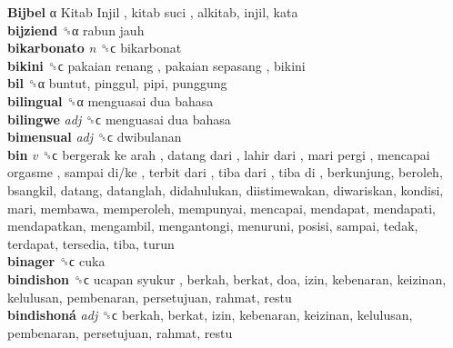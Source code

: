 \textbf{Bijbel} α   Kitab Injil ,  kitab suci , alkitab, injil, kata  \\
\textbf{bijziend} ␝α   rabun jauh   \\
\textbf{bikarbonato} \emph{n}  ␝ϲ  bikarbonat  \\
\textbf{bikini} ␝ϲ   pakaian renang ,  pakaian sepasang , bikini  \\
\textbf{bil} ␝α  buntut, pinggul, pipi, punggung  \\
\textbf{bilingual} ␝α   menguasai dua bahasa   \\
\textbf{bilingwe} \emph{adj}  ␝ϲ   menguasai dua bahasa   \\
\textbf{bimensual} \emph{adj}  ␝ϲ  dwibulanan  \\
\textbf{bin} \emph{v}  ␝ϲ   bergerak ke arah ,  datang dari ,  lahir dari ,  mari pergi ,  mencapai orgasme ,  sampai di/ke ,  terbit dari ,  tiba dari ,  tiba di , berkunjung, beroleh, bsangkil, datang, datanglah, didahulukan, diistimewakan, diwariskan, kondisi, mari, membawa, memperoleh, mempunyai, mencapai, mendapat, mendapati, mendapatkan, mengambil, mengantongi, menuruni, posisi, sampai, tedak, terdapat, tersedia, tiba, turun  \\
\textbf{binager} ␝ϲ  cuka  \\
\textbf{bindishon} ␝ϲ   ucapan syukur , berkah, berkat, doa, izin, kebenaran, keizinan, kelulusan, pembenaran, persetujuan, rahmat, restu  \\
\textbf{bindishoná} \emph{adj}  ␝ϲ  berkah, berkat, izin, kebenaran, keizinan, kelulusan, pembenaran, persetujuan, rahmat, restu  \\
